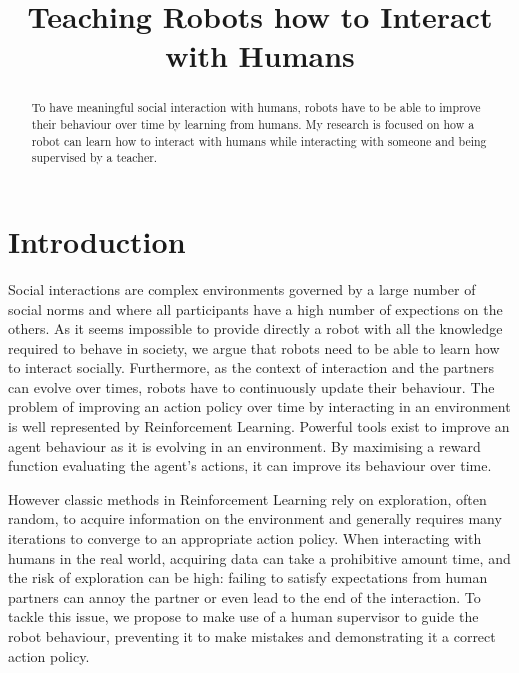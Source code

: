 \documentclass[conference]{IEEEtran}
\begin{document}
\title{Teaching Robots how to Interact with Humans}

\author{
}

\maketitle

\begin{abstract}

To have meaningful social interaction with humans, robots have to be able to improve
    their behaviour over time by learning from humans. My research is
    focused on how a robot can learn how to interact with humans while
    interacting with someone and being supervised by a teacher.

\end{abstract}

\section{Introduction}

Social interactions are complex environments governed by a large number of
social norms and where all participants have a high number of expections on the
others.  As it seems impossible to provide directly a robot with all the
knowledge required to behave in society, we argue that robots need to be able to
learn how to interact socially. Furthermore, as the context of interaction and
the partners can evolve over times, robots have to continuously update their
behaviour.  The problem of improving an action policy over time by interacting
in an environment is well represented by Reinforcement Learning. Powerful tools
exist to improve an agent behaviour as it is evolving in an environment. By
maximising a reward function evaluating the agent's actions, it can improve its
behaviour over time. 

However classic methods in Reinforcement Learning rely on exploration, often
random, to acquire information on the environment and generally requires many
iterations to converge to an appropriate action policy. When interacting with
humans in the real world, acquiring data can take a prohibitive amount time, and the
risk of exploration can be high: failing to satisfy expectations from human
partners can annoy the partner or even lead to the end of the interaction. To
tackle this issue, we propose to make use of a human supervisor to guide the
robot behaviour, preventing it to make mistakes and demonstrating it a correct
action policy.
\end{document}
